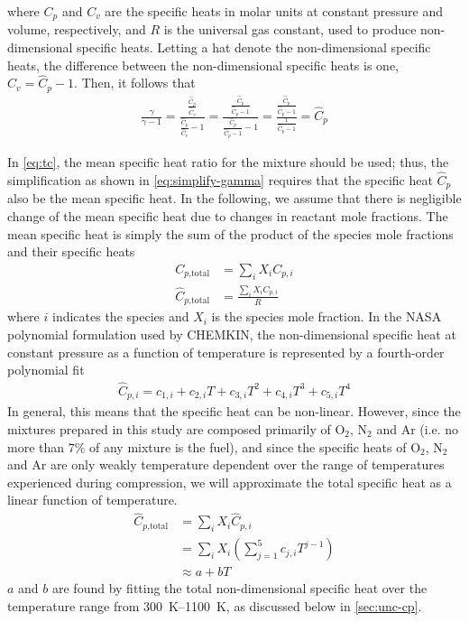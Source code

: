 \documentclass[12pt, letterpaper]{article}
\begin{document}
where $C_p$ and $C_v$ are the specific heats in molar units at constant
pressure and volume, respectively, and $R$ is the universal gas constant,
used to produce non-dimensional specific heats. Letting a hat denote the
non-dimensional specific heats, the difference between the non-dimensional
specific heats is one, $\hat{C}_v = \hat{C}_p - 1$. Then, it follows that
%
\begin{align}
\label{eq:simplify-gamma}
\frac{\gamma}{\gamma - 1} = \frac{\frac{\hat{C}_p}{\hat{C}_v}}{\frac{\hat{C}_p}{\hat{C}_v} - 1}
= \frac{\frac{\hat{C}_p}{\hat{C}_p - 1}}{\frac{\hat{C}_p}{\hat{C}_p - 1} - 1}
= \frac{\frac{\hat{C}_p}{\hat{C}_p - 1}}{\frac{1}{\hat{C}_p - 1}}
= \hat{C}_p
\end{align}

In \autoref{eq:tc}, the mean specific heat ratio for the mixture
should be used; thus, the simplification as shown in \autoref{eq:simplify-gamma}
requires that the specific heat $\hat{C}_p$ also be the mean specific
heat. In the following, we assume that there is negligible
change of the mean specific heat due to changes in reactant
mole fractions. The mean specific heat is simply the sum of the product of
the species mole fractions and their specific heats
%
\begin{subequations}
\label{eq:cp}
\begin{align}
C_{p\text{,total}} &= \sum_i X_i C_{p,i} \\
\hat{C}_{p\text{,total}} &= \frac{\sum_i X_i C_{p,i}}{R}
\end{align}
\end{subequations}
%
where $i$ indicates the species and $X_i$ is the species mole fraction.
In the NASA polynomial formulation used by CHEMKIN, the non-dimensional specific
heat at constant pressure as a function of temperature is represented by a
fourth-order polynomial fit
%
\begin{align}
\hat{C}_{p,i} = c_{1,i} + c_{2,i} T + c_{3,i} T^2 + c_{4,i} T^3 + c_{5,i} T^4
\end{align}
%
In general, this means that the specific heat can be non-linear. However,
since the mixtures prepared in this study are composed primarily of
O$_2$, N$_2$ and Ar (i.e. no more than 7\% of any mixture is the
fuel), and since the specific heats of O$_2$, N$_2$ and Ar are only weakly
temperature dependent over the range of temperatures experienced during
compression, we will approximate the total specific heat as a linear function
of temperature.
%
\begin{equation}%
\label{eq:cp-total}
\begin{split}
\hat{C}_{p\text{,total}} &= \sum_i X_i \hat{C}_{p,i} \\
&= \sum_i X_i \left( \sum_{j=1}^5 c_{j,i} T^{j-1} \right) \\
&\approx a + b T
\end{split}
\end{equation}
%
$a$ and $b$ are found by fitting the total non-dimensional specific heat
over the temperature range from \SIrange{300}{1100}{\kelvin}, as discussed below in
\autoref{sec:unc-cp}.
\end{document}
